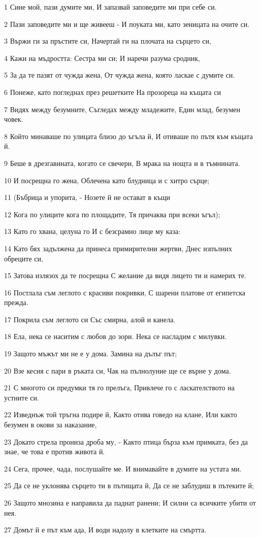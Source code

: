 \par 1 Сине мой, пази думите ми, И запазвай заповедите ми при себе си.
\par 2 Пази заповедите ми и ще живееш - И поуката ми, като зеницата на очите си.
\par 3 Вържи ги за пръстите си, Начертай ги на плочата на сърцето си,
\par 4 Кажи на мъдростта: Сестра ми си; И наречи разума сродник,
\par 5 За да те пазят от чужда жена, От чужда жена, която ласкае с думите си.
\par 6 Понеже, като погледнах през решетките На прозореца на къщата си
\par 7 Видях между безумните, Съгледах между младежите, Един млад, безумен човек.
\par 8 Който минаваше по улицата близо до ъгъла й, И отиваше по пътя към къщата й.
\par 9 Беше в дрезгавината, когато се свечери, В мрака на нощта и в тъмнината.
\par 10 И посрещна го жена, Облечена като блудница и с хитро сърце;
\par 11 (Бъбрица и упорита, - Нозете й не остават в къщи
\par 12 Кога по улиците кога по площадите, Тя причаква при всеки ъгъл);
\par 13 Като го хвана, целуна го И с безсрамно лице му каза:
\par 14 Като бях задължена да принеса примирителни жертви, Днес изпълних обреците си,
\par 15 Затова излязох да те посрещна С желание да видя лицето ти и намерих те.
\par 16 Постлала съм леглото с красиви покривки, С шарени платове от египетска прежда.
\par 17 Покрила съм леглото си Със смирна, алой и канела.
\par 18 Ела, нека се наситим с любов до зори. Нека се насладим с милувки.
\par 19 Защото мъжът ми не е у дома. Замина на дълъг път;
\par 20 Взе кесия с пари в ръката си, Чак на пълнолуние ще се върне у дома.
\par 21 С многото си предумки тя го прелъга, Привлече го с ласкателството на устните си.
\par 22 Изведнъж той тръгна подире й, Както отива говедо на клане, Или както безумен в окови за наказание,
\par 23 Докато стрела прониза дроба му, - Както птица бърза към примката, без да знае, че това е против живота й.
\par 24 Сега, прочее, чада, послушайте ме. И внимавайте в думите на устата ми.
\par 25 Да се не уклонява сърцето ти в пътищата й, Да се не заблудиш в пътеките й;
\par 26 Защото мнозина е направила да паднат ранени; И силни са всичките убити от нея.
\par 27 Домът й е път към ада, И води надолу в клетките на смъртта.

